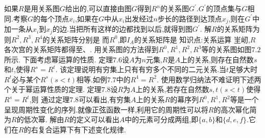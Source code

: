 如果$R$是用关系图$G$给出的,可以直接由图$G$得到$R^{n}$的关系图$G^{\prime}.G^{\prime}$的顶点集与$G$相同.考察$G$的每个顶点$x_{i}$,如果在$G$中从$x_{i}$出发经过$n$步长的路径到达顶点$x_{j}$,则在$G^{\prime}$中加一条从$x_{i}$到$x_{j}$的边.当把所有这样的边都找到以后,就得到图$G^{\prime}$.
解$R$的关系矩阵为
则$R^{2},R^{3},R^{4}$的关系矩阵分别是
而$R^{0}$,即$I_{A}$的关系矩阵是
知识点:关系运算
㞷屻,$R$各次宫的关系矩阵都得至$、.$
用关系图的方法得到$R^{0},R^{1},R^{2},R^{3}$等的关系图如图$7.2$所示.
下面考虑幂运算的性质.
定理$7.6$设$A$为$n$元集,$R$是$A$上的关系,则存在自然数$s$和$t$,使得$R^{s}=R^{t}$.
该定理说明有穷集上只有有穷多个不同的二元关系.当$t$足够大时$R^{t}$必与某个$R^{s}(s<t)$相等.如例$7.7$中的$R^{4}=R^{2}$.
使用数学归纳法不难证明下述两个关于幂运算性质的定理.
定理$7.8$设$R$为$A$上的关系,若存在自然数$s,t(s<t)$使得$R^{s}=R^{t}$,则
通过定理$7.8$可以看出,有穷集$A$上的关系$R$的幕序列$R^{0},R^{1},R^{2}$等是一个呈现周期性变化的序列.就像正弦函数一样,利用它的周期性可以将$R$的高次幂化简为$R$的低次幂.
解由$R$的定义可以看出$A$中的元素可分成两组,即$\{a,b\}$和$\{d,e,f\}$.它们在$R$的右复合运算下有下述变化规律.
